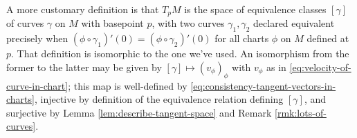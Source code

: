 \documentclass[reqno]{amsart} 
\begin{document}
\begin{remark}\label{rmk:tangent-vectors-via-curves}
  A more customary definition is that $T_p M$ is the space of
  equivalence classes $[\gamma]$ of curves $\gamma$ on $M$ with
  basepoint $p$, with two curves $\gamma_1, \gamma_2$ declared
  equivalent precisely when
  $(\phi \circ \gamma_1)'(0) = (\phi \circ \gamma_2)'(0)$ for
  all charts $\phi$ on $M$ defined at $p$.  That definition is
  isomorphic to the one we've used.  An isomorphism from the
  former to the latter may be given by
  $[\gamma] \mapsto (v_\phi)_\phi$ with $v_\phi$ as in \eqref{eq:velocity-of-curve-in-chart}; this
  map is well-defined by
  \eqref{eq:consistency-tangent-vectors-in-charts}, injective by
  definition of the equivalence relation defining $[\gamma]$,
  and surjective by Lemma \ref{lem:describe-tangent-space} and
  Remark \ref{rmk:lots-of-curves}.
\end{remark}
\end{document}
